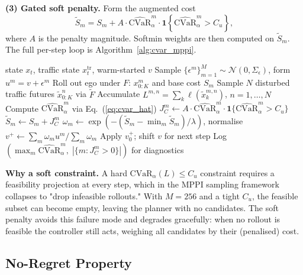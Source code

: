 \documentclass[letterpaper, 10 pt, conference]{ieeeconf}
\begin{document}
\textbf{(3) Gated soft penalty.} Form the augmented cost
\begin{equation}
\tilde{S}_m = S_m + A \cdot \widehat{\mathrm{CVaR}}_\alpha^m \cdot \mathbf{1}\!\left\{\widehat{\mathrm{CVaR}}_\alpha^m > C_u\right\},
\label{eq:s_tilde}
\end{equation}
where $A$ is the penalty magnitude. Softmin weights are then computed on $\tilde{S}_m$. The full per-step loop is Algorithm~\ref{alg:cvar_mppi}.

\begin{algorithm}[t]
\caption{Online Soft-Constrained CVaR-MPPI Step}
\label{alg:cvar_mppi}
\begin{algorithmic}[1]
\Require state $x_t$, traffic state $x_t^\mathrm{tr}$, warm-started $v$
\State Sample $\{\epsilon^m\}_{m=1}^M \sim \mathcal{N}(0, \Sigma_\epsilon)$, form $u^m = v + \epsilon^m$
\State Roll out ego under $F$: $x^m_{0:K}$ and base cost $S_m$
\State Sample $N$ disturbed traffic futures $\tilde{x}^n_{0:K}$ via $\tilde{F}$
    \State Accumulate $L^{m,n} = \sum_{k} \ell(\tilde{x}^{m,n}_k)$, $n = 1, \dots, N$
    \State Compute $\widehat{\mathrm{CVaR}}_\alpha^m$ via Eq.~(\ref{eq:cvar_hat})
    \State $J_C^m \gets A \cdot \widehat{\mathrm{CVaR}}_\alpha^m \cdot \mathbf{1}\{\widehat{\mathrm{CVaR}}_\alpha^m > C_u\}$
    \State $\tilde{S}_m \gets S_m + J_C^m$
\EndFor
\State $\omega_m \gets \exp(-(\tilde{S}_m - \min_m \tilde{S}_m)/\lambda)$, normalise
\State $v^+ \gets \sum_m \omega_m u^m / \sum_m \omega_m$
\State Apply $v_0^+$; shift $v$ for next step
\State Log $(\max_m \widehat{\mathrm{CVaR}}_\alpha^m,\; |\{m : J_C^m > 0\}|)$ for diagnostics
\end{algorithmic}
\end{algorithm}

\textbf{Why a soft constraint.} A hard $\mathrm{CVaR}_\alpha(L) \le C_u$ constraint requires a feasibility projection at every step, which in the MPPI sampling framework collapses to "drop infeasible rollouts." With $M = 256$ and a tight $C_u$, the feasible subset can become empty, leaving the planner with no candidates. The soft penalty avoids this failure mode and degrades gracefully: when no rollout is feasible the controller still acts, weighing all candidates by their (penalised) cost.

\subsection{No-Regret Property}
\label{sec:noregret}
\end{document}

